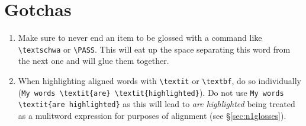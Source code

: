 \documentclass[output=paper]{langscibook}
\newcommand{\cmd}[1]{\texttt{\textbackslash#1}}
\begin{document}

\section{Gotchas}
\begin{enumerate}
\item Make sure to never end an item to be glossed with a command like \cmd{textschwa} or \cmd{PASS}. This will eat up the space separating this word from the next one and will glue them together. 
\item When highlighting aligned words with \cmd{textit} or \cmd{textbf}, do so individually (\verb+My words \textit{are} \textit{highlighted}+). Do not use \verb+My words+ \verb+\textit{are highlighted}+ as this will lead to \textit{are highlighted} being treated as a mulitword expression for purposes of alignment (see §\ref{sec:n1glosses}).
\end{enumerate}
 
\end{document}
